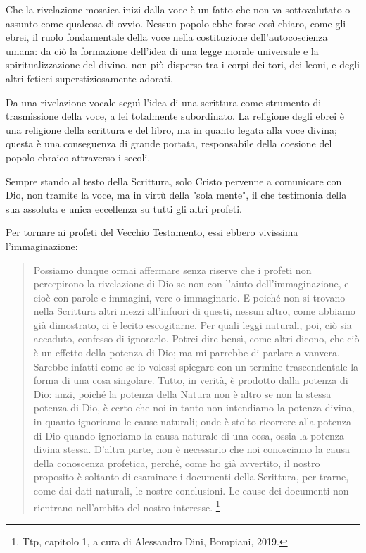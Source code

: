 Che la rivelazione mosaica inizi dalla voce è un fatto che non va sottovalutato o assunto come
qualcosa di ovvio. Nessun popolo ebbe forse così chiaro, come gli ebrei, il ruolo
fondamentale della voce nella costituzione dell'autocoscienza umana: da ciò la formazione dell'idea di una legge morale universale e la spiritualizzazione
del divino, non più disperso tra i corpi dei tori, dei leoni, e degli altri feticci
superstiziosamente adorati.

Da una rivelazione vocale seguì l'idea di una scrittura come
strumento di trasmissione della voce, a lei totalmente subordinato. La religione degli ebrei è una
religione della scrittura e del libro, ma in quanto legata alla voce divina; questa è una conseguenza di grande portata, responsabile
della coesione del popolo ebraico attraverso i secoli.

Sempre stando al testo della Scrittura, solo Cristo pervenne a
comunicare con Dio, non tramite la voce, ma in virtù della "sola mente", il che
testimonia della sua assoluta e unica eccellenza su tutti gli altri profeti.

Per tornare ai profeti del Vecchio Testamento, essi ebbero vivissima l'immaginazione:

\begin{quotation}
	\small Possiamo dunque ormai affermare senza riserve che i profeti non percepirono la rivelazione di Dio
	se non con l'aiuto dell'immaginazione, e cioè con parole e immagini, vere o immaginarie. E poiché
	non si trovano nella Scrittura altri mezzi all'infuori di questi, nessun altro, come abbiamo già
	dimostrato, ci è lecito escogitarne. Per quali leggi naturali, poi, ciò sia accaduto, confesso di
	ignorarlo. Potrei dire bensì, come altri dicono, che ciò è un effetto della potenza di Dio; ma mi
	parrebbe di parlare a vanvera. Sarebbe infatti come se io volessi spiegare con un termine
	trascendentale la forma di una cosa singolare. Tutto, in verità, è prodotto dalla potenza di Dio: anzi,
	poiché la potenza della Natura non è altro se non la stessa potenza di Dio, è certo che noi in tanto non intendiamo la potenza divina, in quanto ignoriamo le cause naturali; onde è stolto ricorrere
	alla potenza di Dio quando ignoriamo la causa naturale di una cosa, ossia la potenza divina stessa.
	D'altra parte, non è necessario che noi conosciamo la causa della conoscenza profetica, perché,
	come ho già avvertito, il nostro proposito è soltanto di esaminare i documenti della Scrittura, per
	trarne, come dai dati naturali, le nostre conclusioni. Le cause dei documenti non rientrano
	nell'ambito del nostro interesse. \footnote{Ttp, capitolo 1, a cura di Alessandro Dini, Bompiani, 2019.}
\end{quotation}

